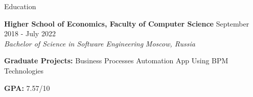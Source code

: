 \documentclass[
	11pt, %
]{resume} %
\begin{document}

\begin{rSection}{Education}
	
	
	\textbf{Higher School of Economics, Faculty of Computer Science} \hfill {September 2018 - July 2022} \\
	\textit{Bachelor of Science in Software Engineering} \hfill \textit{Moscow, Russia}
	
	\textbf{Graduate Projects:} Business Processes Automation App Using BPM Technologies
	
	\textbf{GPA:} 7.57/10
	
\end{rSection}

\end{document}
